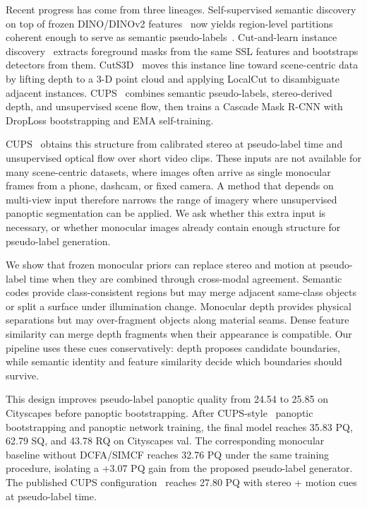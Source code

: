 \documentclass[10pt,twocolumn,letterpaper]{article}
\begin{document}
Recent progress has come from three lineages. Self-supervised semantic discovery on top of frozen DINO/DINOv2 features~\cite{caron2021dino,oquab2024dinov2} now yields region-level partitions coherent enough to serve as semantic pseudo-labels~\cite{hamilton2022stego,kim2024cause}. Cut-and-learn instance discovery~\cite{simeoni2021lost,wang2023tokencut,wang2023cutler} extracts foreground masks from the same SSL features and bootstraps detectors from them. CutS3D~\cite{sick2025cuts3d} moves this instance line toward scene-centric data by lifting depth to a 3-D point cloud and applying LocalCut to disambiguate adjacent instances. CUPS~\cite{hahn2025cups} combines semantic pseudo-labels, stereo-derived depth, and unsupervised scene flow, then trains a Cascade Mask R-CNN with DropLoss bootstrapping and EMA self-training.

CUPS~\cite{hahn2025cups} obtains this structure from calibrated stereo at pseudo-label time and unsupervised optical flow over short video clips. These inputs are not available for many scene-centric datasets, where images often arrive as single monocular frames from a phone, dashcam, or fixed camera. A method that depends on multi-view input therefore narrows the range of imagery where unsupervised panoptic segmentation can be applied. We ask whether this extra input is necessary, or whether monocular images already contain enough structure for pseudo-label generation.

We show that frozen monocular priors can replace stereo and motion at pseudo-label time when they are combined through cross-modal agreement. Semantic codes provide class-consistent regions but may merge adjacent same-class objects or split a surface under illumination change. Monocular depth provides physical separations but may over-fragment objects along material seams. Dense feature similarity can merge depth fragments when their appearance is compatible. Our pipeline uses these cues conservatively: depth proposes candidate boundaries, while semantic identity and feature similarity decide which boundaries should survive.

This design improves pseudo-label panoptic quality from 24.54 to 25.85 on Cityscapes before panoptic bootstrapping. After CUPS-style~\cite{hahn2025cups} panoptic bootstrapping and panoptic network training, the final model reaches 35.83 PQ, 62.79 SQ, and 43.78 RQ on Cityscapes val. The corresponding monocular baseline without DCFA/SIMCF reaches 32.76 PQ under the same training procedure, isolating a +3.07 PQ gain from the proposed pseudo-label generator. The published CUPS configuration~\cite{hahn2025cups} reaches 27.80 PQ with stereo + motion cues at pseudo-label time.
\end{document}
